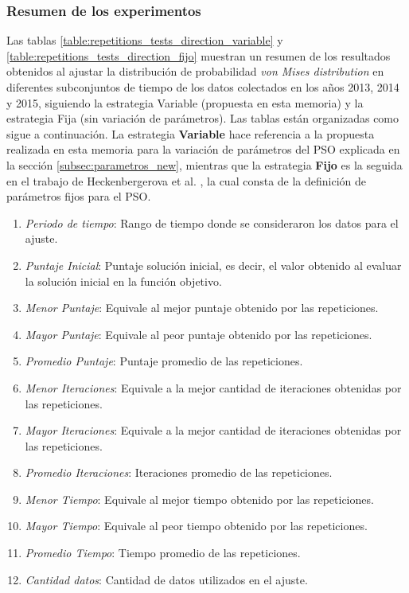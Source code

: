 \subsubsection{Resumen de los experimentos}

Las tablas \ref{table:repetitions_tests_direction_variable} y \ref{table:repetitions_tests_direction_fijo} muestran un resumen de los resultados obtenidos al ajustar la distribución de probabilidad \emph{von Mises distribution} en diferentes subconjuntos de tiempo de los datos colectados en los años 2013, 2014 y 2015, siguiendo la estrategia Variable (propuesta en esta memoria) y la estrategia Fija (sin variación de parámetros). Las tablas están organizadas como sigue a continuación. La estrategia \textbf{Variable} hace referencia a la propuesta realizada en esta memoria para la variación de parámetros del PSO explicada en la sección \ref{subsec:parametros_new}, mientras que la estrategia \textbf{Fijo} es la seguida en el trabajo de Heckenbergerova et al. \cite{Heckenbergerova15}, la cual consta de la definición de parámetros fijos para el PSO.
\begin{enumerate}
    \item \emph{Periodo de tiempo}: Rango de tiempo donde se consideraron los datos para el ajuste.
    \item \emph{Puntaje Inicial}: Puntaje solución inicial, es decir, el valor obtenido al evaluar la solución inicial en la función objetivo.
    \item \emph{Menor Puntaje}: Equivale al mejor puntaje obtenido por las repeticiones.
    \item \emph{Mayor Puntaje}: Equivale al peor puntaje obtenido por las repeticiones.
    \item \emph{Promedio Puntaje}: Puntaje promedio de las repeticiones.
    \item \emph{Menor Iteraciones}: Equivale a la mejor cantidad de iteraciones obtenidas por las repeticiones.
    \item \emph{Mayor Iteraciones}: Equivale a la mejor cantidad de iteraciones obtenidas por las repeticiones. 
    \item \emph{Promedio Iteraciones}: Iteraciones promedio de las repeticiones. 
    \item \emph{Menor Tiempo}: Equivale al mejor tiempo obtenido por las repeticiones.
    \item \emph{Mayor Tiempo}: Equivale al peor tiempo obtenido por las repeticiones.
    \item \emph{Promedio Tiempo}: Tiempo promedio de las repeticiones.
    \item \emph{Cantidad datos}: Cantidad de datos utilizados en el ajuste.
\end{enumerate}

